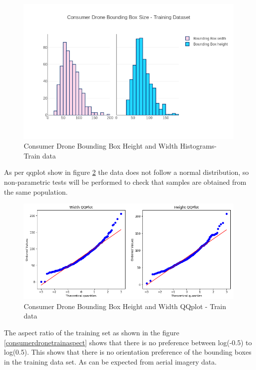\documentclass{article}
\begin{document}
\begin{figure}[h]
\centering
\label{consumerdronetrainhist}
\includegraphics[scale=0.4]{images/train-histogram.png}
\caption{Consumer Drone Bounding Box Height and Width Histograms- Train data}
\end{figure}

As per qqplot show in figure \ref{consumerdronetrainqqplot} the data does not follow a normal distribution, so non-parametric tests will be performed to check that samples are obtained from the same population. 

\begin{figure}[h]
\centering
\label{consumerdronetrainqqplot}
\includegraphics[scale=0.4]{images/train-qqplot.png}
\caption{Consumer Drone Bounding Box Height and Width QQplot - Train data}
\end{figure}

The aspect ratio of the training set as shown in the figure \ref{consumerdronetrainaspect} shows that there is no preference between log(-0.5) to log(0.5). This shows that there is no orientation preference of the bounding boxes in the training data set. As can be expected from aerial imagery data.
\end{document}
